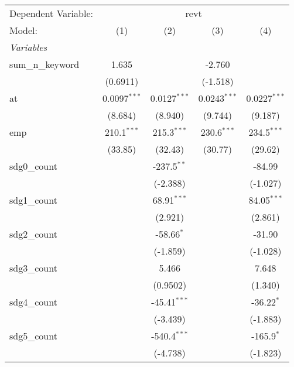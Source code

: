 
\begingroup
\centering
\begin{tabular}{lcccc}
   \tabularnewline \midrule \midrule
   Dependent Variable: & \multicolumn{4}{c}{revt}\\
   Model:            & (1)            & (2)            & (3)            & (4)\\  
   \midrule
   \emph{Variables}\\
   sum\_n\_keyword   & 1.635          &                & -2.760         &   \\   
                     & (0.6911)       &                & (-1.518)       &   \\   
   at                & 0.0097$^{***}$ & 0.0127$^{***}$ & 0.0243$^{***}$ & 0.0227$^{***}$\\   
                     & (8.684)        & (8.940)        & (9.744)        & (9.187)\\   
   emp               & 210.1$^{***}$  & 215.3$^{***}$  & 230.6$^{***}$  & 234.5$^{***}$\\   
                     & (33.85)        & (32.43)        & (30.77)        & (29.62)\\   
   sdg0\_count       &                & -237.5$^{**}$  &                & -84.99\\   
                     &                & (-2.388)       &                & (-1.027)\\   
   sdg1\_count       &                & 68.91$^{***}$  &                & 84.05$^{***}$\\   
                     &                & (2.921)        &                & (2.861)\\   
   sdg2\_count       &                & -58.66$^{*}$   &                & -31.90\\   
                     &                & (-1.859)       &                & (-1.028)\\   
   sdg3\_count       &                & 5.466          &                & 7.648\\   
                     &                & (0.9502)       &                & (1.340)\\   
   sdg4\_count       &                & -45.41$^{***}$ &                & -36.22$^{*}$\\   
                     &                & (-3.439)       &                & (-1.883)\\   
   sdg5\_count       &                & -540.4$^{***}$ &                & -165.9$^{*}$\\   
                     &                & (-4.738)       &                & (-1.823)\\   

\end{tabular}
